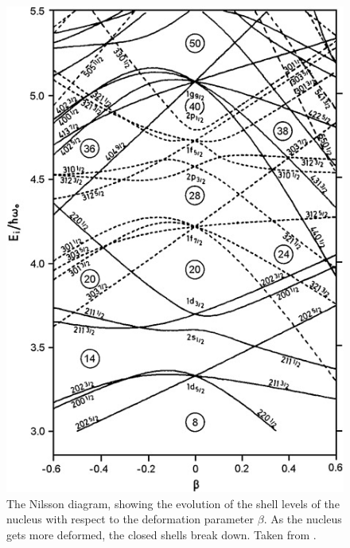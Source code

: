 \begin{figure}
    \centering
    \includegraphics{Introduction_Figs/nilsson.jpg}
    \caption{The Nilsson diagram, showing the evolution of the shell levels of the nucleus with respect to the deformation parameter $\beta$. As the nucleus gets more deformed, the closed shells break down. Taken from \citep{choppin13:_nilsson}.}
    \label{fig:nilsson}
\end{figure}